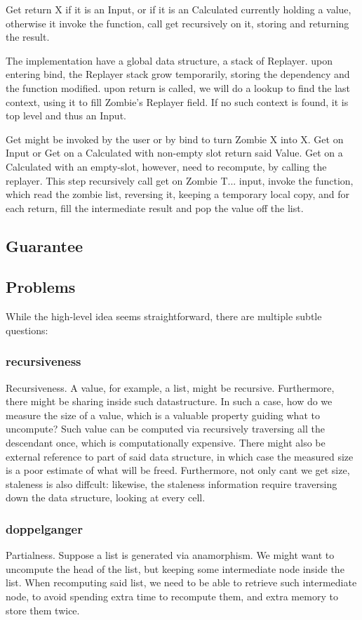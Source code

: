 Get return X if it is an Input, or if it is an Calculated currently holding a value, otherwise it invoke the function, call get recursively on it, storing and returning the result.

The implementation have a global data structure, a stack of Replayer. upon entering bind, the Replayer stack grow temporarily, storing the dependency and the function modified. upon return is called, we will do a lookup to find the last context, using it to fill Zombie's Replayer field. If no such context is found, it is top level and thus an Input.

Get might be invoked by the user or by bind to turn Zombie X into X. Get on Input or Get on a Calculated with non-empty slot return said Value. Get on a Calculated with an empty-slot, however, need to recompute, by calling the replayer. This step recursively call get on Zombie T... input, invoke the function, which read the zombie list, reversing it, keeping a temporary local copy, and for each return, fill the intermediate result and pop the value off the list.
\subsection{Guarantee}
\subsection{Problems}
While the high-level idea seems straightforward, there are multiple subtle questions: 
\subsubsection{recursiveness}
 Recursiveness. A value, for example, a list, might be recursive. Furthermore, there might be sharing inside such datastructure. In such a case, how do we measure the size of a value, which is a valuable property guiding what to uncompute? Such value can be computed via recursively traversing all the descendant once, which is computationally expensive. There might also be external reference to part of said data structure, in which case the measured size is a poor estimate of what will be freed. Furthermore, not only cant we get size, staleness is also diffcult: likewise, the staleness information require traversing down the data structure, looking at every cell.
\subsubsection{doppelganger}
Partialness. Suppose a list is generated via anamorphism. We might want to uncompute the head of the list, but keeping some intermediate node inside the list.
When recomputing said list, we need to be able to retrieve such intermediate node, to
avoid spending extra time to recompute them, and extra memory to store them twice.
